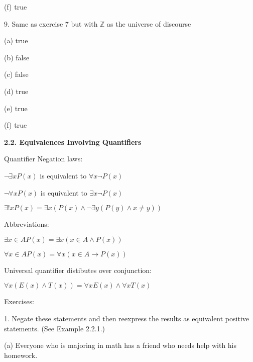 \documentclass{article}
\begin{document}
(f) true

\vspace{30pt}

9. Same as exercise 7 but with $\mathbb{Z}$ as the universe of discourse
\vspace{30pt}

(a) true

\vspace{20pt}

(b) false

\vspace{20pt}

(c) false

\vspace{20pt}

(d) true

\vspace{20pt}

(e) true

\vspace{20pt}

(f) true

\vspace{30pt}

\textbf{2.2. Equivalences Involving Quantifiers}

Quantifier Negation laws:

$\neg \exists x P(x)$ is equivalent to $\forall x \neg P(x)$

$\neg \forall x P(x)$ is equivalent to $\exists x \neg P(x)$
\vspace{30pt}

$\exists !x P(x) = \exists x (P(x) \land \neg \exists y (P(y) \land x \neq y))$

Abbreviations:

$\exists x \in A P(x) = \exists x (x \in A \land P(x))$

$\forall x \in A P(x) = \forall x (x \in A \to P(x))$

Universal quantifier distibutes over conjunction:

$\forall x (E(x) \land T(x)) = \forall x E(x) \land \forall x T(x)$

\vspace{50pt}

Exercises:

1. Negate these statements and then reexpress the results as equivalent positive statements. (See Example 2.2.1.)

\hspace{12pt}(a) Everyone who is majoring in math has a friend who needs help with his homework.
\end{document}
